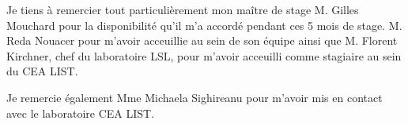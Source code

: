 Je tiens à remercier tout particulièrement mon maître de stage M. Gilles Mouchard pour la disponibilité qu'il m'a accordé pendant ces 5 mois de stage. 
M. Reda Nouacer pour m'avoir acceuillie au sein de son équipe ainsi que M. Florent Kirchner,
chef du laboratoire LSL, pour m'avoir acceuilli comme stagiaire au sein du CEA LIST.

Je remercie également Mme Michaela Sighireanu pour m'avoir mis en contact avec le laboratoire CEA LIST.